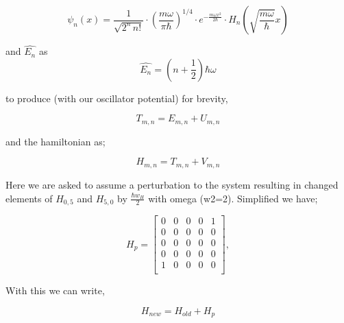 \documentclass[12pt,letterpaper,notitlepage]{article}
\begin{document}
	\begin{equation}
		\psi_n(x) = \frac{1}{\sqrt{2^n\,n!}} \cdot \left(\frac{m\omega}{\pi \hbar}\right)^{1/4}\cdot e^{
		- \frac{m\omega x^2}{2 \hbar}} \cdot H_n\left(\sqrt{\frac{m\omega}{\hbar}} x \right)
	\end{equation}   
	
and $\hat{E_n}$ as 
	\begin{equation}
		\hat{E_n}= \left(n+\frac{1}{2}\right) \hbar \omega	
	\end{equation} 
	
to produce (with our oscillator potential) for brevity,

	\begin{equation}
		T_{m,n}=E_{m,n}+U_{m,n}
	\end{equation}
	
and the hamiltonian as;

	\begin{equation}
		H_{m,n}=T_{m,n}+V_{m,n}
	\end{equation} 

Here we are asked to assume a perturbation to the system resulting in changed elements of $H_{0,5}$ and $H_{5,0}$ by $ \frac{\hbar w_H}{2}$ with omega (w2=2).
Simplified we have;

\begin{equation}
		H_p =
					\begin{bmatrix}
					0 		& 0    	& 0 		& 0 		& 1 \\
					0 		& 0 		& 0 		& 0 		& 0 \\
					0 		& 0 		& 0 		& 0 		& 0 \\
					0 		& 0 		& 0 		& 0 		& 0 \\
					1		& 0	        & 0		& 0		& 0 \\
					\end{bmatrix},		
	\end{equation}	
	
With this we can write,

	\begin{equation}
		H_{new}=H_{old}+H_p
	\end{equation}
\end{document}
